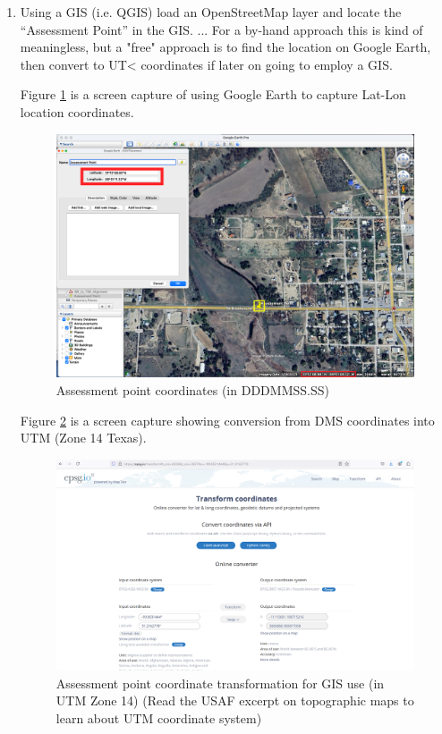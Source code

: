 \documentclass[12pt]{article}
\begin{document}
\clearpage

\begin{enumerate}
\item Using a GIS (i.e. QGIS) load an OpenStreetMap layer and locate the ``Assessment Point'' in the GIS.  ... For a by-hand approach this is kind of meaningless, but a "free" approach is to find the location on Google Earth, then convert to UT< coordinates if later on going to employ a GIS.

Figure \ref{fig:GEProLocate} is a screen capture of using Google Earth to capture Lat-Lon location coordinates.

\begin{figure}[h!] %
   \centering
   \includegraphics[width=5in]{GEProLatLon.png} 
   \caption{Assessment point coordinates (in DDDMMSS.SS)}
   \label{fig:GEProLocate}
\end{figure}

Figure \ref{fig:DMS2UTM} is a screen capture showing conversion from DMS coordinates into UTM (Zone 14 Texas).

\begin{figure}[h!] %
   \centering
   \includegraphics[width=5in]{CoordinateTransform.png} 
   \caption{Assessment point coordinate transformation for GIS use (in UTM Zone 14) (Read the USAF excerpt on topographic maps to learn about UTM coordinate system)}
   \label{fig:DMS2UTM}
\end{figure}


\end{enumerate}
\end{document}
